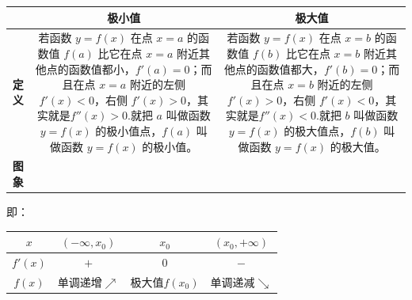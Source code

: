 \documentclass{article}
\begin{document}
\begin{table}[H]
  \centering
  \begin{tabular}{|c|c|c|}
    \hline
    & \textbf{极小值} & \textbf{极大值} \\
    \hline
    \textbf{定义} & 
    \parbox{0.4\textwidth}{
      若函数 \(y = f(x)\) 在点 \(x = a\) 的函数值 \(f(a)\) 比它在点 \(x = a\) 附近其他点的函数值都小，\(f'(a) = 0\)；而且在点 \(x = a\) 附近的左侧 \(f'(x) < 0\)，右侧 \(f'(x) > 0\)，其实就是\(f''(x)>0\).就把 \(a\) 叫做函数 \(y = f(x)\) 的极小值点，\(f(a)\) 叫做函数 \(y = f(x)\) 的极小值。
    }
    & 
    \parbox{0.4\textwidth}{
      若函数 \(y = f(x)\) 在点 \(x = b\) 的函数值 \(f(b)\) 比它在点 \(x = b\) 附近其他点的函数值都大，\(f'(b) = 0\)；而且在点 \(x = b\) 附近的左侧 \(f'(x) > 0\)，右侧 \(f'(x) < 0\)，其实就是\(f''(x)<0\).就把 \(b\) 叫做函数 \(y = f(x)\) 的极大值点，\(f(b)\) 叫做函数 \(y = f(x)\) 的极大值。
    } \\
    \hline
    \textbf{图象} & 
    & 
     \\
    \hline
  \end{tabular}
\end{table}
即：
\vspace{2\baselineskip}
\begin{center}
\begin{tabular}{|c|c|c|c|}
\hline
$x$ & $(-\infty,x_0)$ & $x_0$ & $(x_0,+\infty)$ \\
\hline
$f'(x)$ & $+$ & $0$ & $-$ \\
\hline
$f(x)$ & 单调递增$\nearrow$ & 极大值$f(x_0)$ & 单调递减$\searrow$ \\
\hline
\end{tabular}
\end{center}
\end{document}
